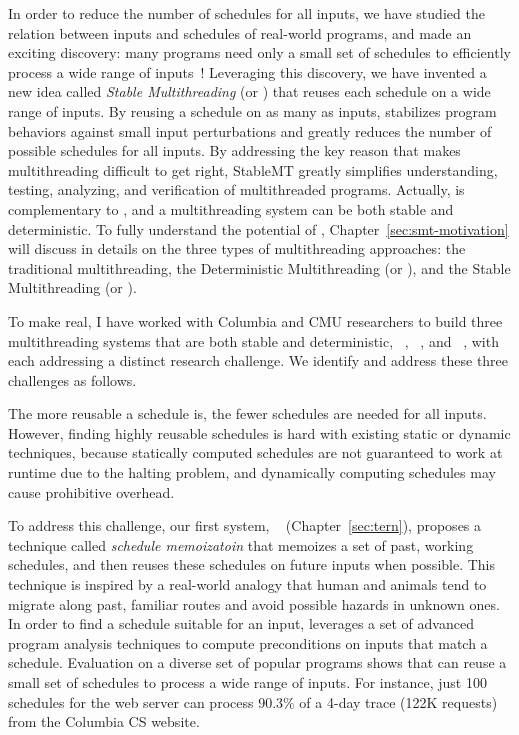 In order to reduce the number of schedules for all inputs, we have studied the
relation between inputs and schedules of real-world programs, and made an
exciting discovery: many programs need only a small set of schedules to
efficiently process a wide range of inputs~\cite{smt:cacm}! Leveraging this
discovery, we have invented a new idea called \emph{Stable Multithreading} (or 
\emph{\smt}) that reuses each schedule on a wide range of inputs. By reusing a 
schedule on as many as inputs, \smt stabilizes program behaviors against small 
input perturbations and greatly reduces the number of possible schedules for all
inputs. By addressing the key reason that makes multithreading difficult to get
right, StableMT greatly simplifies understanding, testing, analyzing,
and verification of multithreaded programs. Actually, \smt is
complementary to \dmt, and a multithreading system can be both stable and 
deterministic. To fully understand the potential of \smt, 
Chapter~\ref{sec:smt-motivation} will discuss in details on the three types of 
multithreading approaches: the traditional multithreading, the Deterministic 
Multithreading (or \dmt), and the Stable Multithreading (or \smt).


To make \smt real, I have worked with Columbia and CMU researchers to build
three multithreading systems that are both stable and deterministic, 
\tern~\cite{cui:tern:osdi10}, \peregrine~\cite{peregrine:sosp11}, and 
\parrot~\cite{parrot:sosp13}, with each addressing a distinct research 
challenge. We identify and address these three challenges as follows.

 The more reusable a schedule is, the fewer schedules are needed for 
all inputs.
However, finding highly reusable schedules is hard with existing static or
dynamic techniques, because statically computed schedules are not guaranteed to
work at runtime due to the halting problem, and dynamically computing schedules
may cause prohibitive overhead.

To address this challenge, our first \smt system, 
\tern~\cite{cui:tern:osdi10} (Chapter~\ref{sec:tern}), proposes a technique 
called \emph{schedule memoizatoin} that memoizes a set of past, working 
schedules, and then reuses these schedules on future inputs when possible. This 
technique is inspired by a real-world analogy that human and animals tend to 
migrate along past, familiar routes and avoid possible hazards in unknown ones. 
In order to find a schedule suitable for an input, \tern leverages a set of 
advanced program analysis techniques to compute preconditions on inputs that 
match a schedule. Evaluation on a diverse set of popular programs shows that 
\tern can reuse a small set of schedules to process a wide range of inputs. For 
instance, just 100 schedules for the \apache web server can process 90.3\% of a 
4-day trace (122K requests) from the Columbia CS website.

